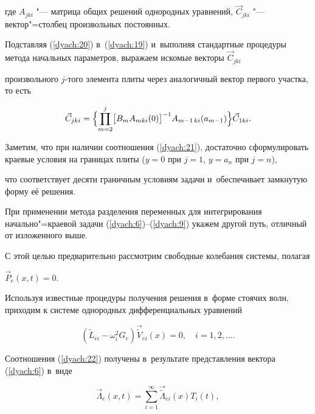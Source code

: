 где  $A_{jki}$ "--- матрица общих решений однородных уравнений,  $\vec{C}_{jki}$ "--- вектор"=столбец произвольных постоянных.

Подставляя (\ref{dyach:20}) в~(\ref{dyach:19}) и~выполняя стандартные процедуры метода начальных параметров, выражаем искомые векторы $\vec{C}_{jki}$

произвольного $j$-того элемента плиты через аналогичный вектор первого участка, то есть

\begin{equation}

\label{dyach:21}

\vec{C}_{jki}=\Bigl\{ \prod \limits_{m=2}^{j}\bigl[B_m A_{mki}(0)\bigr]^{-1}A_{m-1\,ki}(a_{m-1})\Bigr\}\vec{C}_{1ki}.

\end{equation}



Заметим, что при наличии соотношения (\ref{dyach:21}), достаточно сформулировать краевые условия на границах плиты ($y=0$ при $j=1$, $y=a_n$ при $j=n$),

что соответствует десяти граничным условиям задачи и~обеспечивает замкнутую форму её решения.



При  применении метода разделения переменных для интегрирования начально"=краевой задачи (\ref{dyach:6})--(\ref{dyach:9}) укажем другой путь, отличный от изложенного выше.


С этой целью предварительно рассмотрим свободные колебания системы, полагая

$\vec{P}_{e}(x,t)=0$.

Используя известные процедуры получения решения в~форме стоячих волн, приходим к системе однородных дифференциальных уравнений

\begin{equation}

\label{dyach:22}

(\widetilde{L}_{ei}-\omega_{i}^{2}G_{e})\vec{\widetilde{V}}{}_{ei}(x)=0, \quad i=1, 2, \ldots.

\end{equation}

Соотношения (\ref{dyach:22}) получены в~результате представления вектора (\ref{dyach:6}) в~виде

 \begin{equation}

\label{dyach:23}

\vec{\Lambda}_{e}(x,t)=\sum\limits_{i=1}^{\infty}\vec{\widetilde{\Lambda}}_{ei}(x)T_{i}(t),

\end{equation}

